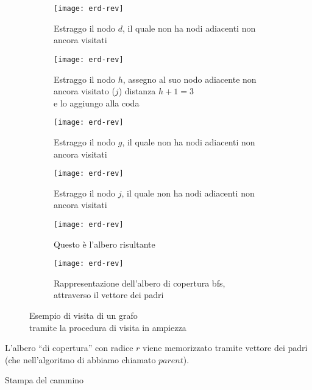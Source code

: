 \begin{figure}[H]

	\begin{subfigure}[t]{.45\textwidth}
		\addtocounter{subfigure}{6}
		\texttt{[image: erd-rev]}
		\caption{Estraggo il nodo \(d\),
			il quale non ha nodi adiacenti non ancora visitati}
	\end{subfigure}\hfill
	\begin{subfigure}[t]{.45\textwidth}
		\texttt{[image: erd-rev]}
		\caption{Estraggo il nodo \(h\),
			assegno al suo nodo adiacente non ancora visitato (\(j\)) distanza \(h+1 = 3\)\\
			e lo aggiungo alla coda}
	\end{subfigure}

	\begin{subfigure}[t]{.45\textwidth}
		\texttt{[image: erd-rev]}
		\caption{Estraggo il nodo \(g\),
			il quale non ha nodi adiacenti non ancora visitati}
	\end{subfigure}\hfill
	\begin{subfigure}[t]{.45\textwidth}
		\texttt{[image: erd-rev]}
		\caption{Estraggo il nodo \(j\),
			il quale non ha nodi adiacenti non ancora visitati}
	\end{subfigure}

	\begin{subfigure}[t]{.45\textwidth}
		\texttt{[image: erd-rev]}
		\caption{Questo è l'albero risultante}
	\end{subfigure}\hfill
	\begin{subfigure}[t]{.45\textwidth}
		\texttt{[image: erd-rev]}
		\caption{Rappresentazione dell'albero di copertura \textsf{bfs},
				 attraverso il vettore dei padri}
	\end{subfigure}

	\addtocounter{figure}{-1}
	\caption{Esempio di visita di un grafo\\tramite la procedura di visita in ampiezza}
\end{figure}

L'albero \enquote{di copertura} con radice \(r\) viene memorizzato tramite vettore dei padri (che nell'algoritmo di \erdos abbiamo chiamato \(parent\)).

\clearpage
\begin{algorithm}[H]
	\caption[]{Stampa del cammino}
	
\end{algorithm}

